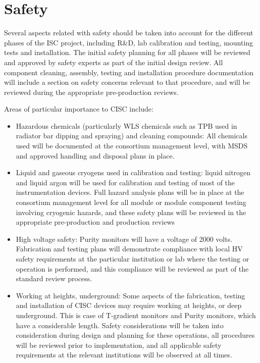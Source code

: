 \section{Safety}
\label{sec:fdsp-slow-cryo-safety}


Several aspects related with safety should be taken into account for the different phases of the ISC project, including R\&D, lab calibration and testing, mounting tests and installation. 
The initial safety planning for all phases will be reviewed and approved by safety experts as part of the initial design review.
All component cleaning, assembly, testing  and installation procedure documentation will include a section on safety concerns
relevant to that procedure, and will be reviewed during the appropriate pre-production reviews.

Areas of particular importance to CISC include:
\begin{itemize}
\item Hazardous chemicals (particularly WLS chemicals such as TPB used in radiator bar dipping and spraying) and cleaning compounds:
  All chemicals used will be documented at the consortium management level, with MSDS and approved handling and disposal plans in place.

\item Liquid and gaseous cryogens used in calibration and testing: liquid nitrogen and liquid argon will be used for calibration and testing of most of the instrumentation devices.
  Full hazard analysis plans will be in place at the consortium management level for all module or
  module component testing involving cryogenic hazards, and these safety plans will be reviewed in the appropriate pre-production and production reviews

\item High voltage safety:  Purity monitors will have a voltage of 2000 volts. Fabrication and testing plans will demonstrate compliance with local
  HV safety requirements at the particular institution or lab where the testing or operation is performed, and this compliance will be reviewed as part of the standard review process.


\item Working at heights, underground: Some aspects of the fabrication, testing and installation of CISC devices may require working at heights, or deep underground. This is
  case of T-gradient monitors and Purity monitors, which have a considerable length.   
  Safety considerations will be taken into consideration during design and planning for these operations, all procedures will be reviewed prior to implementation,
  and all applicable safety requirements at the relevant institutions will be observed at all times.
\end{itemize}